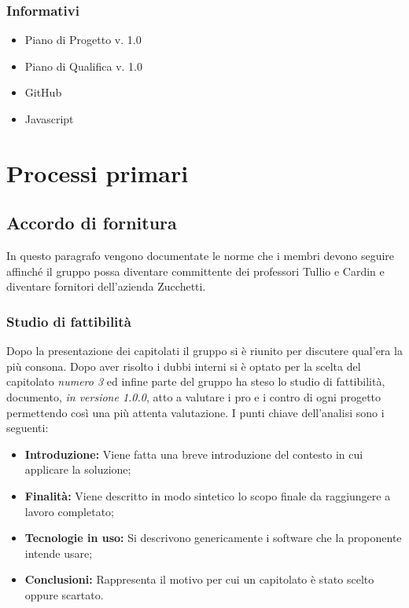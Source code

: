 \documentclass{article}
\begin{document}
    \subsubsection{Informativi}
    \begin{itemize}
        \item Piano di Progetto v. 1.0
        \item Piano di Qualifica v. 1.0
        \item GitHub
        \item Javascript
    \end{itemize}


\newpage

\section{Processi primari}
    \subsection{Accordo di fornitura}
    In questo paragrafo vengono documentate le norme che i membri devono seguire affinché il gruppo possa diventare committente dei professori Tullio e Cardin e diventare fornitori dell'azienda Zucchetti.
        \subsubsection{Studio di fattibilità}
        Dopo la presentazione dei capitolati il gruppo si è riunito per discutere qual'era la più consona. Dopo aver risolto i dubbi interni si è optato per la scelta del capitolato \textit{numero 3} ed infine parte del gruppo ha steso lo studio di fattibilità, documento, \textit{in versione 1.0.0},  atto a valutare i pro e i contro di ogni progetto permettendo così una più attenta valutazione. \newline
        I punti chiave dell'analisi sono i seguenti:
    \begin{itemize}
	   \item \textbf{Introduzione:} Viene fatta una breve introduzione del contesto in cui applicare la soluzione;
	   \item \textbf{Finalità: } Viene descritto in modo sintetico lo scopo finale da raggiungere a lavoro completato;
	   \item \textbf{Tecnologie in uso:} Si descrivono genericamente i software che la proponente intende usare;
	   \item \textbf{Conclusioni:} Rappresenta il motivo per cui un capitolato è stato scelto oppure scartato.
    \end{itemize}
\end{document}
